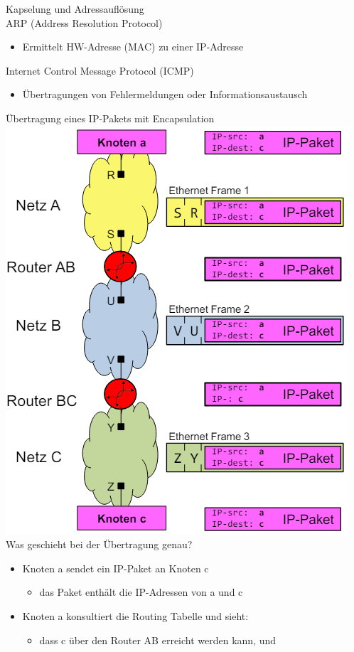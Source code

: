 \begin{KR}{Kapselung und Adressauflösung}\\
    ARP (Address Resolution Protocol)
    \begin{itemize}
        \item Ermittelt HW-Adresse (MAC) zu einer IP-Adresse
    \end{itemize}
    Internet Control Message Protocol (ICMP)
    \begin{itemize}
        \item Übertragungen von Fehlermeldungen oder Informationsaustausch
    \end{itemize}
\end{KR}

\begin{example2}{Übertragung eines IP-Pakets mit Encapsulation}\\
    \includegraphics[width=0.6\linewidth]{images/encapsulation_bsp.png}\\
    Was geschieht bei der Übertragung genau?
    \begin{itemize}
        \item Knoten a sendet ein IP-Paket an Knoten c
        \begin{itemize}
            \item das Paket enthält die IP-Adressen von a und c
        \end{itemize}
        \item Knoten a konsultiert die Routing Tabelle und sieht:
        \begin{itemize}
            \item dass c über den Router AB erreicht werden kann, und

\end{itemize}
\end{itemize}
\end{example2}
